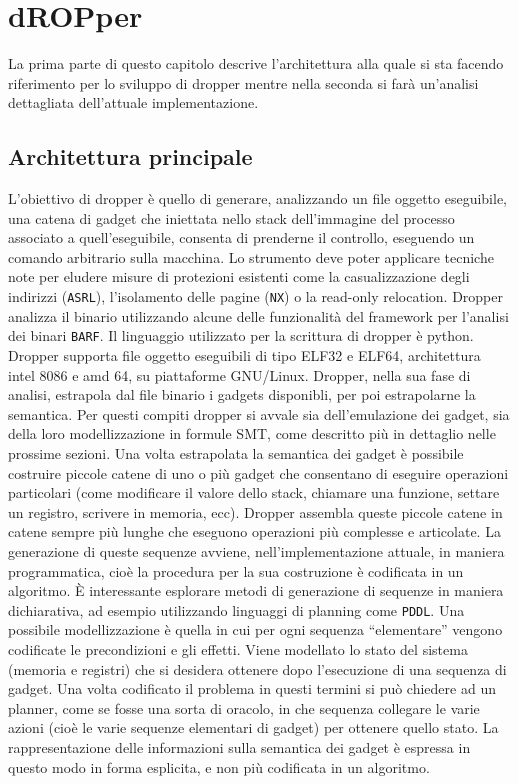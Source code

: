 \chapter{dROPper}

La prima parte di questo capitolo descrive l'architettura alla quale
si sta facendo riferimento per lo sviluppo di dropper mentre nella
seconda si farà un'analisi dettagliata dell'attuale implementazione.

\section{Architettura principale}

L'obiettivo di dropper è quello di generare, analizzando un file
oggetto eseguibile, una catena di gadget che iniettata nello stack
dell'immagine del processo associato a quell'eseguibile, consenta di
prenderne il controllo, eseguendo un comando arbitrario sulla
macchina. Lo strumento deve poter applicare tecniche note per eludere
misure di protezioni esistenti come la casualizzazione degli indirizzi
(\lstinline{ASRL}), l'isolamento delle pagine (\lstinline{NX}) o la
read-only relocation. Dropper analizza il binario utilizzando alcune
delle funzionalità del framework per l'analisi dei binari
\lstinline{BARF}. Il linguaggio utilizzato per la scrittura di dropper
è python. Dropper supporta file oggetto eseguibili di tipo ELF32 e
ELF64, architettura intel 8086 e amd 64, su piattaforme
GNU/Linux. Dropper, nella sua fase di analisi, estrapola dal file
binario i gadgets disponibli, per poi estrapolarne la semantica. Per
questi compiti dropper si avvale sia dell'emulazione dei gadget, sia
della loro modellizzazione in formule SMT, come descritto più in
dettaglio nelle prossime sezioni. Una volta estrapolata la semantica
dei gadget è possibile costruire piccole catene di uno o più gadget
che consentano di eseguire operazioni particolari (come modificare il
valore dello stack, chiamare una funzione, settare un registro,
scrivere in memoria, ecc). Dropper assembla queste piccole catene in
catene sempre più lunghe che eseguono operazioni più complesse e
articolate. La generazione di queste sequenze avviene,
nell'implementazione attuale, in maniera programmatica, cioè la
procedura per la sua costruzione è codificata in un algoritmo. È
interessante esplorare metodi di generazione di sequenze in maniera
dichiarativa, ad esempio utilizzando linguaggi di planning come
\lstinline{PDDL}\cite{pddl-97}. Una possibile modellizzazione è quella
in cui per ogni sequenza ``elementare'' vengono codificate le
precondizioni e gli effetti. Viene modellato lo stato del sistema
(memoria e registri) che si desidera ottenere dopo l'esecuzione di una
sequenza di gadget. Una volta codificato il problema in questi termini
si può chiedere ad un planner, come se fosse una sorta di oracolo, in
che sequenza collegare le varie azioni (cioè le varie sequenze
elementari di gadget) per ottenere quello stato. La rappresentazione
delle informazioni sulla semantica dei gadget è espressa in questo
modo in forma esplicita, e non più codificata in un algoritmo.

